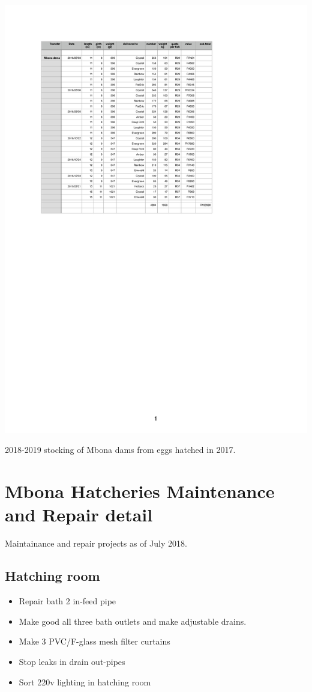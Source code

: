 \begin{table}[H]
  \centering
  \includegraphics[scale = 1.2]{tables/TablesMbonaDamSales.pdf}
   \caption{2018-2019 stocking of Mbona dams from eggs hatched in 2017.}
  \label{tab:MbonaDamSales2018}
\end{table}


\section{Mbona Hatcheries Maintenance and Repair detail}

Maintainance and repair projects as of July 2018.

\subsection{Hatching room}     

\begin{itemize}
\item Repair bath 2 in-feed pipe
\item Make good all three bath outlets and make adjustable drains. 
\item Make 3 PVC/F-glass mesh filter curtains  
\item Stop leaks in drain out-pipes
\item Sort 220v lighting in hatching room
\end{itemize}

